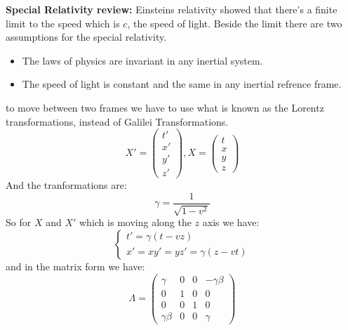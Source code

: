\documentclass[10pt,a4paper]{article}
\begin{document}
          \textbf{Special Relativity review:} Einsteins relativity showed that there's a finite limit to the speed which is $c$, the speed of light. Beside the limit there are two assumptions for the special relativity.
          \begin{itemize}
               \item The laws of physics are invariant in any inertial system.
               \item The speed of light is constant and the same in any inertial refrence frame.
          \end{itemize}
          to move between two frames we have to use what is known as the Lorentz transformations, instead of Galilei Transformations.
          \begin{equation}
               X' = \begin{pmatrix}
                         t' \\ x' \\ y'\\ z'
                    \end{pmatrix},
               X = \begin{pmatrix}
                         t\\ x\\ y\\ z
                    \end{pmatrix}
          \end{equation}
          And the tranformations are:
          \begin{equation}
               \gamma = \frac{1}{\sqrt{1-v^2}}
          \end{equation}
          So for $X$ and $X'$ which is moving along the $z$ axis we have:
          \begin{equation}
               \left\{  \begin{matrix}
                    t' = \gamma(t-v z)\\
                    x' = x
                    y' = y
                    z' = \gamma(z- vt)
               \end{matrix}\right.
          \end{equation}
          and in the matrix form we have:
          \begin{equation}
               \Lambda =\begin{pmatrix}
                    \gamma &0&0& - \gamma\beta\\
                    0&1&0&0\\
                    0&0&1&0\\
                    \gamma\beta&0&0&\gamma
               \end{pmatrix}
          \end{equation}
\end{document}
